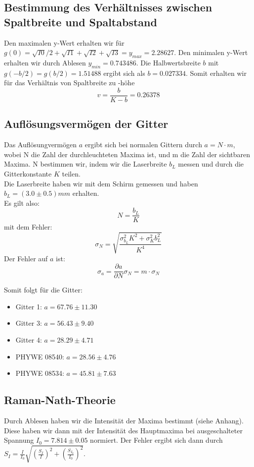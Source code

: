 \subsection{Bestimmung des Verh\"altnisses zwischen Spaltbreite und Spaltabstand}

Den maximalen y-Wert erhalten wir für $g\left( 0 \right) = \sqrt{I0}/2+\sqrt{I1}+\sqrt{I2}+\sqrt{I3} = y_{max} = 2.28627 $. Den minimalen y-Wert erhalten wir durch Ablesen $ y_{min} = 0.743486 $. Die Halbwertsbreite $b$ mit $ g\left( - b/2 \right) = g \left( b/2 \right) = 1.51488 $ ergibt sich als $ b = 0.027334 $. Somit erhalten wir für das Verhältnis von Spaltbreite zu -höhe
$$ v = \frac{b}{K-b} = 0.26378 $$ %

\subsection{Aufl\"osungsverm\"ogen der Gitter}

Das Aufl\"osungverm\"ogen $a$ ergibt sich bei normalen Gittern durch $a=N\cdot m$, wobei N die Zahl der durchleuchteten Maxima ist, und m die Zahl der sichtbaren Maxima. N bestimmen wir, indem wir die Laserbreite $b_L$ messen und durch die Gitterkonstante $K$ teilen.\\
Die Laserbreite haben wir mit dem Schirm gemessen und haben $b_L = (3.0 \pm 0.5) mm$ erhalten.\\
Es gilt also: $$N = \frac{b_L}{K}$$
mit dem Fehler: $$\sigma_N = \sqrt{\frac{\sigma_{b_L}^2K^2 + \sigma_K^2b_L^2}{K^4}}$$
Der Fehler auf $a$ ist: $$\sigma_a = \frac{\partial a}{\partial N}\sigma_N = m\cdot \sigma_N$$

Somit folgt f\"ur die Gitter:

\begin{itemize}
\item Gitter 1: $ a = 67.76 \pm 11.30 $
\item Gitter 3: $ a = 56.43 \pm 9.40 $
\item Gitter 4: $ a = 28.29 \pm 4.71 $
\item PHYWE 08540: $ a = 28.56 \pm 4.76 $
\item PHYWE 08534: $ a = 45.81 \pm 7.63 $
\end{itemize}


\subsection{Raman-Nath-Theorie}
Durch Ablesen haben wir die Intensität der Maxima bestimmt (siehe Anhang). Diese haben wir dann mit der Intensität des Hauptmaxima bei ausgeschalteter Spannung $I_0 = 7.814 \pm 0.05$ normiert. Der Fehler ergibt sich dann durch $S_I = \frac{I}{I_0}  \sqrt{\left(\frac{S_I}{I}\right)^2 + \left(\frac{S_{I_0}}{I_0}\right)^2}$.

